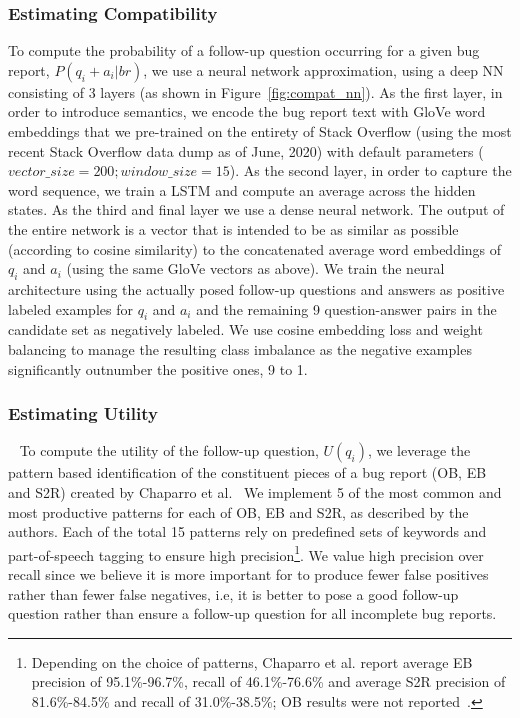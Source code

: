 \subsubsection{Estimating Compatibility}
To compute the probability of a follow-up question occurring for a given bug report, $P(q_{i}+a_{i}|br)$, we use a neural
network approximation, using a deep NN consisting of 3 layers (as shown in Figure~\ref{fig:compat_nn}). As the first layer,
in order to introduce semantics, we encode the bug report text with GloVe word embeddings that we pre-trained on the entirety of Stack Overflow (using the most recent Stack Overflow data dump as of June, 2020) with default parameters ($vector\_size = 200; window\_size = 15$). As the second layer, in order to capture the word sequence, we train a LSTM and compute an average across the hidden states. As the third and final layer we use a dense neural network. The output of the entire network is a vector that is intended to be as similar as possible (according to cosine similarity) to the concatenated average word embeddings of $q_{i}$ and $a_{i}$ (using the same GloVe vectors as above). We train the neural architecture using the actually posed follow-up questions and answers as positive labeled examples for $q_{i}$ and $a_{i}$ and the remaining 9 question-answer pairs in the candidate set as negatively labeled. We use cosine embedding loss and weight balancing to manage the resulting class imbalance as the negative examples significantly outnumber the positive ones, 9 to 1.

\subsubsection{Estimating Utility}~\label{sec:estimate_util}
To compute the utility of the follow-up question, $U(q_{i})$, we leverage the pattern based
identification of the constituent pieces of a bug report (OB, EB and S2R) created by Chaparro 
et al.~\cite{chaparro17detecting}
We implement 5 of the most common and most productive patterns for each of OB, EB and S2R, as described by
the authors. Each of the total 15 patterns rely on predefined sets of keywords and part-of-speech tagging to ensure high
precision\footnote{Depending on the choice of patterns, Chaparro et al. report average EB precision of 95.1\%-96.7\%, recall of 46.1\%-76.6\% and average S2R precision of 81.6\%-84.5\% and recall of 31.0\%-38.5\%; OB results were not reported~\cite{chaparro17detecting}.}. We value high precision over recall since we believe it is more important for \evpi to produce fewer false positives rather than fewer false negatives, i.e, it is better to pose a good follow-up question rather than ensure a follow-up question for all incomplete bug reports.

